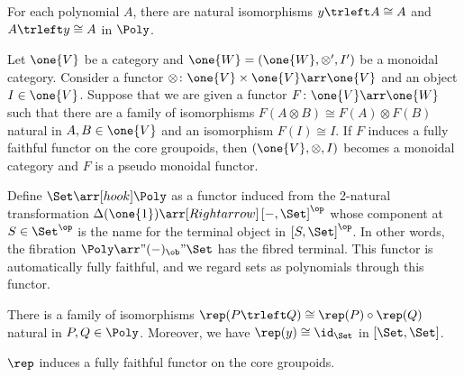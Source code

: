 \begin{proposition}
	For each polynomial $A$,
	there are natural isomorphisms
	$y\trleft A\cong A$
	and
	$A\trleft y\cong A$ in $\Poly$.
\end{proposition}
\begin{proposition}
	\label{prop:EmbInducesMoncat}
	Let $\one{V}$ be a category and $\one{W}=(\one{W},\otimes',I')$ be a monoidal category.
	Consider a functor $\otimes\colon\one{V}\times\one{V}\arr\one{V}$ and an object $I\in\one{V}$.
	Suppose that we are given a functor $F\colon\one{V}\arr\one{W}$
	such that there are a family of isomorphisms $F(A\otimes B)\cong F(A)\otimes F(B)$ natural in $A,B\in\one{V}$
	and an isomorphism $F(I)\cong I$.
	If $F$ induces a fully faithful functor on the core groupoids,
	then $(\one{V},\otimes,I)$ becomes a monoidal category and $F$ is a pseudo monoidal functor.
\end{proposition}
\begin{definition}
	Define
	$\Set\arr[hook]\Poly$
	as a functor induced
	from the 2-natural transformation
	$\Delta(\one{1})\arr[Rightarrow]\left[-,\Set\right]^\op$
	whose component at $S\in\Set^\op$ is the name for the terminal object in $\left[S,\Set\right]^\op$.
	In other words, the fibration $\Poly\arr"{(-)_\ob}"\Set$ has the fibred terminal.
	This functor is automatically fully faithful, and we regard sets as polynomials through this functor.
\end{definition}
\begin{lemma}
	\label{lem:PolyMonoidalCaty}
	There is a family of isomorphisms
	$\rep(P\trleft Q)\cong\rep(P)\circ\rep(Q)$ natural in $P,Q\in\Poly$.
	Moreover, we have $\rep(y)\cong\id_\Set$ in $\left[\Set,\Set\right]$.
\end{lemma}
\begin{proposition}
	\label{prop:repIsEmb}
	$\rep$ induces a fully faithful functor on the core groupoids.
\end{proposition}

